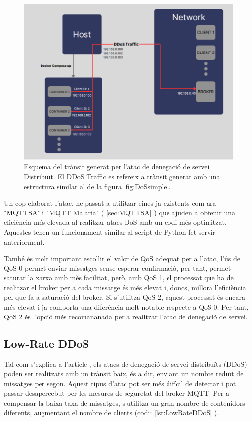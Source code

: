   \begin{figure}[H]
    \centering
    \includegraphics[width=1\textwidth]{img/DDoS.png}
    \caption{Esquema del trànsit generat per l'atac de denegació de servei Distribuït. El DDoS Traffic es refereix a trànsit generat amb una estructura similar al de la figura \ref{fig:DoSsimple}.}
    \label{fig:DDoS}
  \end{figure}

Un cop elaborat l'atac, he passat a utilitzar eines ja existents com ara "MQTTSA" i "MQTT Malaria" ( \ref{sec:MQTTSA} ) que ajuden a obtenir una eficiència més elevada al realitzar atacs DoS amb un codi més optimitzat. Aquestes tenen un funcionament similar al script de Python fet servir anteriorment.

També és molt important escollir el valor de QoS adequat per a l'atac, l'ús de QoS 0 permet enviar missatges sense esperar confirmació, per tant, permet saturar la xarxa amb mès facilitat, però, amb QoS 1, el processat que ha de realitzar el broker per a cada missatge és més elevat i, doncs, millora l'eficiència pel que fa a saturació del broker. Si s'utilitza QoS 2, aquest processat és encara més elevat i ja comporta una diferència molt notable respecte a QoS 0. Per tant, QoS 2 és l'opció més recomananada per a realitzar l'atac de denegació de servei. 

\subsection{Low-Rate DDoS}

Tal com s'explica a l'article \cite{lowrateDDoSexp}, els atacs de denegació de servei distribuïts (DDoS) poden ser realitzats amb un trànsit baix, és a dir, enviant un nombre reduït de missatges per segon. Aquest tipus d'atac pot ser més difícil de detectar i pot passar desapercebut per les mesures de seguretat del broker MQTT. Per a compensar la baixa taxa de missatges, s'utilitza un gran nombre de contenidors diferents, augmentant el nombre de clients (codi: \ref{lst:LowRateDDoS} ).